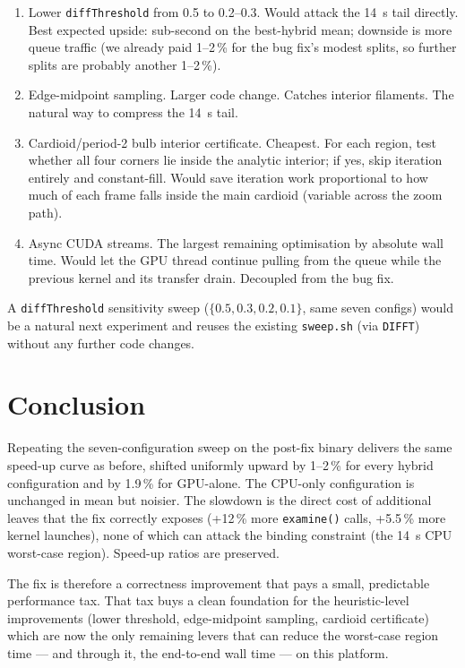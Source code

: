 \documentclass[
	english,
	letterpaper, oneside
]{article}
\begin{document}
\begin{enumerate}
    \item Lower \texttt{diffThreshold} from 0.5 to 0.2--0.3.
    Would attack the 14~s tail directly. Best expected upside:
    sub-second on the best-hybrid mean; downside is more queue traffic
    (we already paid 1--2\,\% for the bug fix's modest splits, so
    further splits are probably another 1--2\,\%).
    \item Edge-midpoint sampling. Larger code change. Catches
    interior filaments. The natural way to compress the 14~s tail.
    \item Cardioid/period-2 bulb interior certificate.
    Cheapest. For each region, test whether all four corners lie inside
    the analytic interior; if yes, skip iteration entirely and constant-fill.
    Would save iteration work proportional to how much of each frame
    falls inside the main cardioid (variable across the zoom path).
    \item Async CUDA streams. The largest remaining
    optimisation by absolute wall time. Would let the GPU thread
    continue pulling from the queue while the previous kernel and its
    transfer drain. Decoupled from the bug fix.
\end{enumerate}

A \texttt{diffThreshold} sensitivity sweep ($\{0.5, 0.3, 0.2, 0.1\}$,
same seven configs) would be a natural next experiment and reuses the
existing \texttt{sweep.sh} (via \texttt{DIFFT}) without any further
code changes.

\section{Conclusion}

Repeating the seven-configuration sweep on the post-fix binary delivers
the same speed-up curve as before, shifted uniformly upward by 1--2\,\%
for every hybrid configuration and by 1.9\,\% for GPU-alone. The CPU-only
configuration is unchanged in mean but noisier. The slowdown is the
direct cost of additional leaves that the fix correctly exposes
(+12\,\% more \texttt{examine()} calls, +5.5\,\% more kernel launches),
none of which can attack the binding constraint (the 14~s CPU
worst-case region). Speed-up ratios are preserved.

The fix is therefore a correctness improvement that pays a small,
predictable performance tax. That tax buys a clean foundation for the
heuristic-level improvements (lower threshold, edge-midpoint sampling,
cardioid certificate) which are now the only remaining levers that can
reduce the worst-case region time --- and through it, the end-to-end
wall time --- on this platform.
\end{document}
